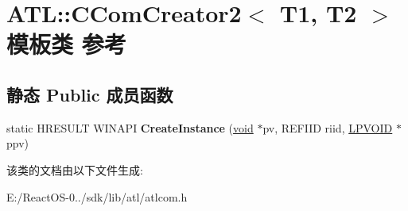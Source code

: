 \hypertarget{class_a_t_l_1_1_c_com_creator2}{}\section{A\+TL\+:\+:C\+Com\+Creator2$<$ T1, T2 $>$ 模板类 参考}
\label{class_a_t_l_1_1_c_com_creator2}
\subsection*{静态 Public 成员函数}
\begin{DoxyCompactItemize}
\item 
\mbox{\label{class_a_t_l_1_1_c_com_creator2_a3ba107b1984890a6a38d2e4d5e3aea98}} 
static H\+R\+E\+S\+U\+LT W\+I\+N\+A\+PI {\bfseries Create\+Instance} (\hyperlink{interfacevoid}{void} $\ast$pv, R\+E\+F\+I\+ID riid, \hyperlink{interfacevoid}{L\+P\+V\+O\+ID} $\ast$ppv)
\end{DoxyCompactItemize}


该类的文档由以下文件生成\+:\begin{DoxyCompactItemize}
\item 
E\+:/\+React\+O\+S-\/0../sdk/lib/atl/atlcom.\+h\end{DoxyCompactItemize}
